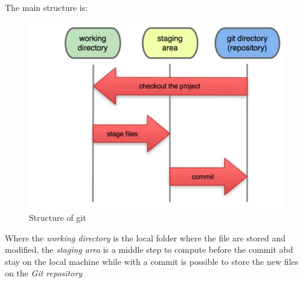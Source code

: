 \documentclass{report}
\begin{document}
The main structure is: 
\begin{figure}[H]
    \centering
    \includegraphics[scale=0.5]{img/git1.jpg}
    \caption{Structure of git}
    \label{git_str}
\end{figure}
Where the \textit{working directory} is the local folder where the file are stored and modified, the \textit{staging area} is a middle step to compute before the commit abd stay on the local machine while with a commit is possible to store the new files on the \textit{Git repository}
\end{document}
